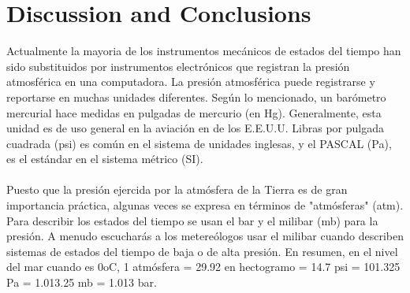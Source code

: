 \section{Discussion and Conclusions}

Actualmente la mayoria de los instrumentos mecánicos de estados del tiempo han sido substituidos por instrumentos electrónicos que registran la presión atmosférica en una computadora. La presión atmosférica puede registrarse y reportarse en muchas unidades diferentes. Según lo mencionado, un barómetro mercurial hace medidas en pulgadas de mercurio (en Hg). Generalmente, esta unidad es de uso general en la aviación en de los E.E.U.U. Libras por pulgada cuadrada (psi) es común en el sistema de unidades inglesas, y el PASCAL (Pa), es el estándar en el sistema métrico (SI). \\\\
Puesto que la presión ejercida por la atmósfera de la Tierra es de gran importancia práctica, algunas veces se expresa en términos de "atmósferas" (atm). Para describir los estados del tiempo se usan el bar y el milibar (mb) para la presión. A menudo escucharás a los metereólogos usar el milibar cuando describen sistemas de estados del tiempo de baja o de alta presión.  En resumen, en el nivel del mar cuando es 0oC, 1 atmósfera = 29.92 en hectogramo = 14.7 psi = 101.325 Pa = 1.013.25 mb = 1.013 bar.\\


